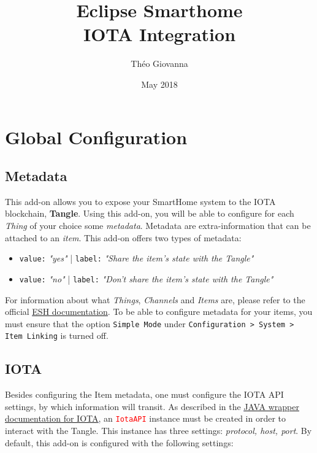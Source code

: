 \documentclass[a4paper,10pt]{article}
\title{Eclipse Smarthome \\ IOTA Integration}
\author{Théo Giovanna}
\date{May 2018}
\begin{document}
\maketitle

\section{Global Configuration}

\subsection{Metadata}

This add-on allows you to expose your SmartHome system to the IOTA blockchain, \textbf{Tangle}.
Using this add-on, you will be able to configure for each \textit{Thing} of your choice some \textit{metadata}. Metadata are extra-information that can be attached to an \textit{item}. This add-on offers two types of metadata: \\

\begin{itemize}
	\item \texttt{value:} \textit{"yes"} | \texttt{label:} \textit{"Share the item's state with the Tangle"}
	\item \texttt{value:} \textit{"no"} | \texttt{label:} \textit{"Don't share the item's state with the Tangle"}
\end{itemize} 

\bigskip

\noindent For information about what \textit{Things}, \textit{Channels} and \textit{Items} are, please refer to the official \textcolor{blue}{\underline{\href{https://www.eclipse.org/smarthome/documentation/index.html}{ESH documentation}}}. To be able to configure metadata for your items, you must ensure that the option \texttt{Simple Mode} under \texttt{Configuration > System > Item Linking} is turned off.

\subsection{IOTA}

\noindent Besides configuring the Item metadata, one must configure the IOTA API settings, by which information will transit. As described in the \textcolor{blue}{\underline{\href{https://github.com/iotaledger/iota.lib.java}{JAVA wrapper documentation for IOTA}}}, an \texttt{\textcolor{red}{IotaAPI}} instance must be created in order to interact with the Tangle. This instance has three settings: \textit{protocol, host, port}. By default, this add-on is configured with the following settings: \\
\end{document}
